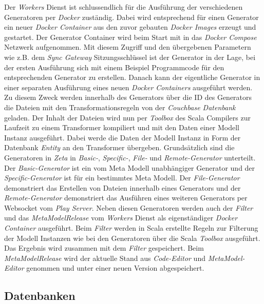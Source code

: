 Der \textit{Workers} Dienst ist schlussendlich für die Ausführung der verschiedenen Generatoren per \textit{Docker} zuständig. Dabei wird entsprechend für einen Generator ein neuer \textit{Docker Container} aus den zuvor gebauten \textit{Docker Images} erzeugt und gestartet. Der Generator Container wird beim Start mit in das \textit{Docker Compose} Netzwerk aufgenommen. Mit diesem Zugriff und den übergebenen Parametern wie z.B. dem \textit{Sync Gateway} Sitzungsschlüssel ist der Generator in der Lage, bei der ersten Ausführung sich mit einem Beispiel Programmcode für den entsprechenden Generator zu erstellen. Danach kann der eigentliche Generator in einer separaten Ausführung eines neuen \textit{Docker Containers} ausgeführt werden. Zu diesem Zweck werden innerhalb des Generators über die ID des Generators die Dateien mit den Transformationsregeln von der \textit{Couchbase Datenbank} geladen. Der Inhalt der Dateien wird nun per \textit{Toolbox} des Scala Compilers zur Laufzeit zu einem Transformer kompiliert und mit den Daten einer Modell Instanz ausgeführt. Dabei werde die Daten der Modell Instanz in Form der Datenbank \textit{Entity} an den Transformer übergeben. Grundsätzlich sind die Generatoren in \textit{Zeta} in \textit{Basic-}, \textit{Specific-}, \textit{File-} und \textit{Remote-Generator} unterteilt. Der \textit{Basic-Generator} ist ein vom Meta Modell unabhängiger Generator und der \textit{Specific-Generator} ist für ein bestimmtes Meta Modell. Der \textit{File-Generator} demonstriert das Erstellen von Dateien innerhalb eines Generators und der \textit{Remote-Generator} demonstriert das Ausführen eines weiteren Generators per Websocket vom \textit{Play Server}. Neben diesen Generatoren werden auch der \textit{Filter} und das \textit{MetaModelRelease} vom \textit{Workers} Dienst als eigenständiger \textit{Docker Container} ausgeführt. Beim \textit{Filter} werden in Scala erstellte Regeln zur Filterung der Modell Instanzen wie bei den Generatoren über die Scala \textit{Toolbox} ausgeführt. Das Ergebnis wird zusammen mit dem \textit{Filter} gespeichert. Beim \textit{MetaModelRelease} wird der aktuelle Stand aus \textit{Code-Editor} und \textit{MetaModel-Editor} genommen und unter einer neuen Version abgespeichert.

\subsection{Datenbanken}

